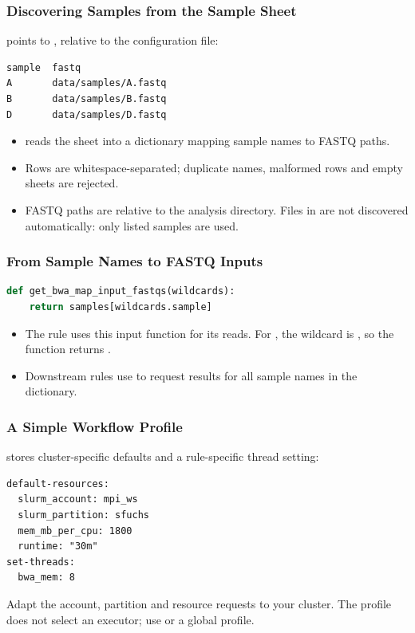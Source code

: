 \begin{frame}[fragile]
    \frametitle{Discovering Samples from the Sample Sheet}
     points to , relative to the configuration file:
    \begin{lstlisting}[style=Plain,basicstyle=\footnotesize]
sample  fastq
A       data/samples/A.fastq
B       data/samples/B.fastq
D       data/samples/D.fastq
    \end{lstlisting}
    \begin{itemize}
        \item {} reads the sheet into a dictionary mapping sample names to FASTQ paths.
        \item Rows are whitespace-separated; duplicate names, malformed rows and empty sheets are rejected.
        \item FASTQ paths are relative to the analysis directory. Files in  are not discovered automatically: only listed samples are used.
    \end{itemize}
\end{frame}

\begin{frame}[fragile]
    \frametitle{From Sample Names to FASTQ Inputs}
    \begin{lstlisting}[language=Python,style=Python,basicstyle=\footnotesize]
def get_bwa_map_input_fastqs(wildcards):
    return samples[wildcards.sample]
    \end{lstlisting}
    \begin{itemize}
        \item The  rule uses this input function for its reads.
        For , the wildcard  is , so the function returns .
        \item Downstream rules use  to request results for all sample names in the dictionary.
    \end{itemize}
\end{frame}

\begin{frame}[fragile]
    \frametitle{A Simple Workflow Profile}
     stores cluster-specific defaults and a rule-specific thread setting:
    \begin{lstlisting}[style=Plain,basicstyle=\footnotesize]
default-resources:
  slurm_account: mpi_ws
  slurm_partition: sfuchs
  mem_mb_per_cpu: 1800
  runtime: "30m"
set-threads:
  bwa_mem: 8
    \end{lstlisting}
    Adapt the account, partition and resource requests to your cluster. The profile does not select an executor; use  or a global profile.
\end{frame}

